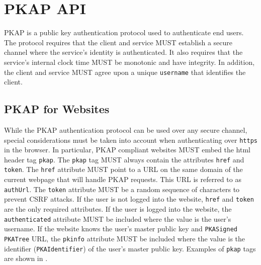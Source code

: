 \documentclass{article}
\newcommand{\pki}{$\mathcal{PK}_i$}
\newcommand{\ids}{\texttt{id$_s$}}
\newcommand{\challenge}{\texttt{challenge}}
\newcommand{\signedchallenge}{\texttt{signed\ challenge}}
\newcommand{\username}{\texttt{username}}
\newcommand{\pkap}{PKAP}
\begin{document}
%

\section{\pkap{} API}
\label{sec:pkap}

\pkap{} is a public key authentication protocol used to authenticate end users. 
The protocol requires that the client and service MUST establish a secure channel where the service's identity is authenticated. %
It also requires that the service's internal clock time MUST be monotonic and have integrity. %
In addition, the client and service MUST agree upon a unique \username{} that identifies the client. 


\subsection{\pkap{} for Websites}

While the \pkap{} authentication protocol can be used over any secure channel, special considerations must be taken into account when authenticating over \texttt{https} in the browser. 
In particular, \pkap{} compliant websites MUST embed the html header tag \texttt{pkap}. 
The \texttt{pkap} tag MUST always contain the attributes \texttt{href} and \texttt{token}. 
The \texttt{href} attribute MUST point to a URL on the same domain of the current webpage that will handle \pkap{} requests. 
This URL is referred to as \texttt{authUrl}. 
The \texttt{token} attribute MUST be a random sequence of characters to prevent CSRF attacks. %
If the user is not logged into the website, \texttt{href} and \texttt{token} are the only required attributes. 
If the user is logged into the website, the \texttt{authenticated} attribute MUST be included where the value is the user's username. 
If the website knows the user's master public key and \texttt{PKASigned PKATree} URL, the \texttt{pkinfo} attribute MUST be included where the value is the identifier (\texttt{PKAIdentifier}) of the user's master public key. 
Examples of \texttt{pkap} tags are shown in . 
\end{document}
